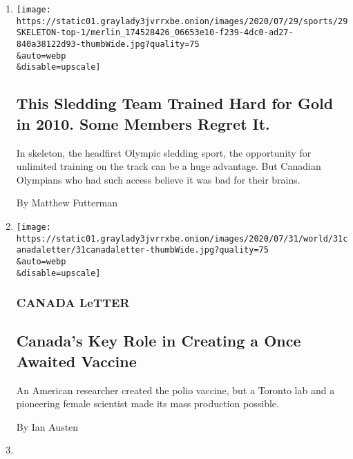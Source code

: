 \begin{enumerate}
\def\labelenumi{\arabic{enumi}.}
\item
  \href{/2020/08/01/sports/olympics/concussion-skeleton-sledding-brain-damage.html}{}

  \texttt{[image: https://static01.graylady3jvrrxbe.onion/images/2020/07/29/sports/29SKELETON-top-1/merlin\_174528426\_06653e10-f239-4dc0-ad27-840a38122d93-thumbWide.jpg?quality=75\\\&auto=webp\\\&disable=upscale]}

  \hypertarget{this-sledding-team-trained-hard-for-gold-in-2010-some-members-regret-it}{%
  \subsection{This Sledding Team Trained Hard for Gold in 2010. Some
  Members Regret
  It.}\label{this-sledding-team-trained-hard-for-gold-in-2010-some-members-regret-it}}

  In skeleton, the headfirst Olympic sledding sport, the opportunity for
  unlimited training on the track can be a huge advantage. But Canadian
  Olympians who had such access believe it was bad for their brains.

  By Matthew Futterman
\item
  \href{/2020/07/31/world/canada/leone-farrell-chemist.html}{}

  \texttt{[image: https://static01.graylady3jvrrxbe.onion/images/2020/07/31/world/31canadaletter/31canadaletter-thumbWide.jpg?quality=75\\\&auto=webp\\\&disable=upscale]}

  \hypertarget{canada-letter}{%
  \subsubsection{CANADA LeTTER}\label{canada-letter}}

  \hypertarget{canadas-key-role-in-creating-a-once-awaited-vaccine}{%
  \subsection{Canada's Key Role in Creating a Once Awaited
  Vaccine}\label{canadas-key-role-in-creating-a-once-awaited-vaccine}}

  An American researcher created the polio vaccine, but a Toronto lab
  and a pioneering female scientist made its mass production possible.

  By Ian Austen
\item
  \href{/2020/07/30/world/canada/justin-trudeau-we-charity.html}{}


\end{enumerate}
